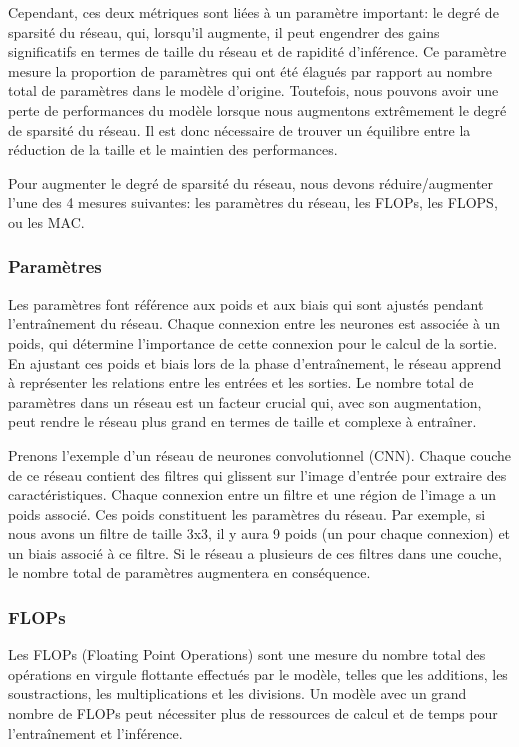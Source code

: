 Cependant, ces deux métriques sont liées à un paramètre important: le degré de sparsité du réseau, qui, lorsqu'il augmente, il peut engendrer des gains significatifs en termes de taille du réseau et de rapidité d'inférence. Ce paramètre mesure la proportion de paramètres qui ont été élagués par rapport au nombre total de paramètres dans le modèle d'origine. Toutefois, nous pouvons avoir une perte de performances du modèle lorsque nous augmentons extrêmement le degré de sparsité du réseau. Il est donc nécessaire de trouver un équilibre entre la réduction de la taille et le maintien des performances.

Pour augmenter le degré de sparsité du réseau, nous devons réduire/augmenter l'une des 4 mesures suivantes: les paramètres du réseau, les FLOPs, les FLOPS, ou les MAC.

\subsubsection{Paramètres}
Les paramètres font référence aux poids et aux biais qui sont ajustés pendant l'entraînement du réseau. Chaque connexion entre les neurones est associée à un poids, qui détermine l'importance de cette connexion pour le calcul de la sortie. En ajustant ces poids et biais lors de la phase d'entraînement, le réseau apprend à représenter les relations entre les entrées et les sorties. Le nombre total de paramètres dans un réseau est un facteur crucial qui, avec son augmentation, peut rendre le réseau plus grand en termes de taille et complexe à entraîner.

Prenons l'exemple d'un réseau de neurones convolutionnel (CNN). Chaque couche de ce réseau contient des filtres qui glissent sur l'image d'entrée pour extraire des caractéristiques. Chaque connexion entre un filtre et une région de l'image a un poids associé. Ces poids constituent les paramètres du réseau. Par exemple, si nous avons un filtre de taille 3x3, il y aura 9 poids (un pour chaque connexion) et un biais associé à ce filtre. Si le réseau a plusieurs de ces filtres dans une couche, le nombre total de paramètres augmentera en conséquence.

\subsubsection{FLOPs}
Les FLOPs (Floating Point Operations) sont une mesure du nombre total des opérations en virgule flottante effectués par le modèle, telles que les additions, les soustractions, les multiplications et les divisions. Un modèle avec un grand nombre de FLOPs peut nécessiter plus de ressources de calcul et de temps pour l'entraînement et l'inférence.

